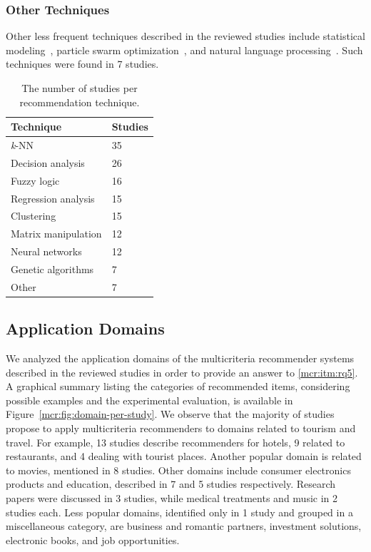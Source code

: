 \subsubsection{Other Techniques}

Other less frequent techniques described in the reviewed studies include statistical modeling~, particle swarm optimization~, and natural language processing~. Such techniques were found in 7 studies.

\begin{table}
\centering
\begin{tabular}{@{}ll@{}}
\toprule
Technique           & Studies \\ \midrule
\textit{k}-NN                & 35      \\
Decision analysis   & 26      \\
Fuzzy logic         & 16      \\
Regression analysis & 15      \\
Clustering          & 15      \\
Matrix manipulation & 12      \\
Neural networks     & 12      \\
Genetic algorithms  & 7       \\
Other               & 7       \\ \bottomrule
\end{tabular}
\caption[Studies per recommendation technique]{The number of studies per recommendation technique.}
\label{mcr:tab:study-per-technique}
\end{table}

\subsection{Application Domains}
\label{mcr:sec:domains}

We analyzed the application domains of the multicriteria recommender systems described in the reviewed studies in order to provide an answer to \ref{mcr:itm:rq5}. A graphical summary listing the categories of recommended items, considering possible examples and the experimental evaluation, is available in Figure~\ref{mcr:fig:domain-per-study}. We observe that the majority of studies propose to apply multicriteria recommenders to domains related to tourism and travel. For example, 13 studies describe recommenders for hotels, 9 related to restaurants, and 4 dealing with tourist places. Another popular domain is related to movies, mentioned in 8 studies. Other domains include consumer electronics products and education, described in 7 and 5 studies respectively. Research papers were discussed in 3 studies, while medical treatments and music in 2 studies each. Less popular domains, identified only in 1 study and grouped in a miscellaneous category, are business and romantic partners, investment solutions, electronic books, and job opportunities.
	
